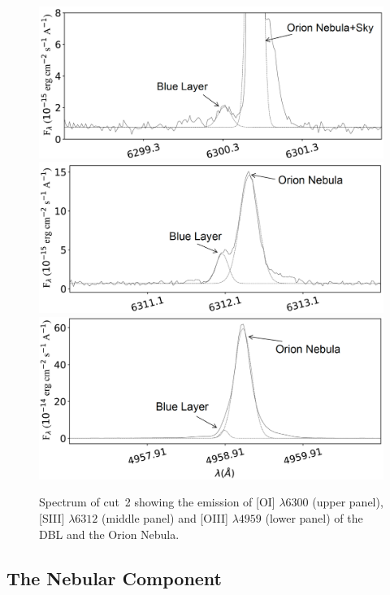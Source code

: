 \documentclass[twocolumn]{aastex63}
\newcommand{\jorge}[1]{{\color{magenta}J: #1}}
\begin{document}
\begin{figure}
\centering
\includegraphics[width=\columnwidth]{cut2_6300.pdf}
\includegraphics[width=\columnwidth]{cut2_6312.pdf}
\includegraphics[width=\columnwidth]{cut2_4959.pdf}
\caption{Spectrum of cut~2 showing the emission of [O\thinspace I] $\lambda 6300$ (upper panel), [S\thinspace III] $\lambda 6312$ (middle panel) and [O\thinspace III] $\lambda 4959$ (lower panel) of the DBL and the Orion Nebula.}
\label{fig:cut2_6300_6312_4959}
\end{figure}

\subsection{The Nebular Component}
\label{subsec:disc_nebular}
\end{document}
